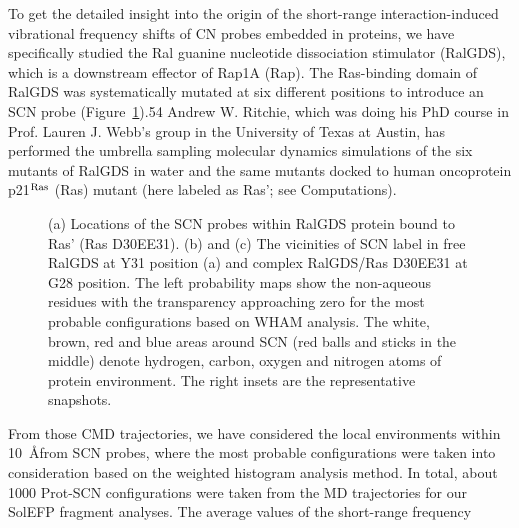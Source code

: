 \documentclass[a4paper,titlepage,twoside,fleqn,12pt]{book}
\begin{document}
\begin{refsection}
To get the detailed insight into the origin of
the short\hyp{}range interaction\hyp{}induced vibrational frequency
shifts of CN probes embedded in proteins, we have specifically
studied the Ral guanine nucleotide dissociation stimulator
(RalGDS), which is a downstream effector of Rap1A (Rap). The
Ras\hyp{}binding domain of RalGDS was systematically mutated at six
different positions to introduce an SCN probe (Figure~\ref{f:prot}).54 
Andrew W. Ritchie, which was doing his PhD course in Prof. Lauren J. Webb's 
group in the University of Texas at Austin,
has performed the umbrella sampling molecular dynamics
simulations of the six mutants of RalGDS in water and the same
mutants docked to human oncoprotein p21$^{\rm Ras}$ (Ras) mutant
(here labeled as Ras'; see Computations). 
%
\begin{figure}[t!]
\centering
\setlength\fboxsep{0.4pt}
\setlength\fboxrule{0.5pt}
\caption{
(a) Locations of the SCN probes within RalGDS protein bound to Ras' (Ras D30E{\textunderscore}E31).
(b) and (c) The vicinities of SCN label in free RalGDS at Y31 position (a)
and complex RalGDS/Ras D30E{\textunderscore}E31 at G28 position. The left probability maps show the
non\hyp{}aqueous residues with the transparency approaching zero for the most probable
configurations based on WHAM analysis. The white, brown, red and blue areas around SCN (red balls and sticks
in the middle) 
denote hydrogen, carbon, oxygen and nitrogen atoms of protein environment. The right insets are the representative
snapshots.
}
\label{f:prot}
\end{figure}
%
From
those CMD trajectories, we have considered the local
environments within 10~\AA from SCN probes, 
where the most probable configurations were taken
into consideration based on the weighted histogram analysis
method. In total, about 1000 Prot-SCN configurations were
taken from the MD trajectories for our SolEFP fragment
analyses. The average values of the short\hyp{}range frequency

\end{refsection}
\end{document}

